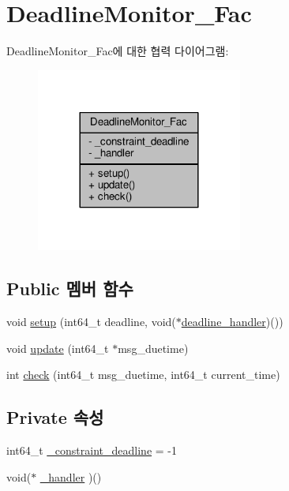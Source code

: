 \hypertarget{classDeadlineMonitor__Fac}{}\section{Deadline\+Monitor\+\_\+\+Fac}
\label{classDeadlineMonitor__Fac}


Deadline\+Monitor\+\_\+\+Fac에 대한 협력 다이어그램\+:\nopagebreak
\begin{figure}[H]
\begin{center}
\leavevmode
\includegraphics[width=192pt]{classDeadlineMonitor__Fac__coll__graph}
\end{center}
\end{figure}
\subsection*{Public 멤버 함수}
\begin{DoxyCompactItemize}
\item 
void \hyperlink{classDeadlineMonitor__Fac_acc97e655dbcbafb1ae421d6097f700c5}{setup} (int64\+\_\+t deadline, void($\ast$\hyperlink{sample__main_8cpp_ae298e0b16475a05fd3d021c2daf90062}{deadline\+\_\+handler})())
\item 
void \hyperlink{classDeadlineMonitor__Fac_a1302d302e9ec205bf409722523560de8}{update} (int64\+\_\+t $\ast$msg\+\_\+duetime)
\item 
int \hyperlink{classDeadlineMonitor__Fac_ad4b3d5ac9779fe651cfe432a95a6051b}{check} (int64\+\_\+t msg\+\_\+duetime, int64\+\_\+t current\+\_\+time)
\end{DoxyCompactItemize}
\subsection*{Private 속성}
\begin{DoxyCompactItemize}
\item 
int64\+\_\+t \hyperlink{classDeadlineMonitor__Fac_a8fe1a647054d4ead7e9d41869bef0234}{\+\_\+constraint\+\_\+deadline} = -\/1
\item 
void($\ast$ \hyperlink{classDeadlineMonitor__Fac_ae36ff128554a0ba47cbcca57543586bb}{\+\_\+handler} )()
\end{DoxyCompactItemize}



